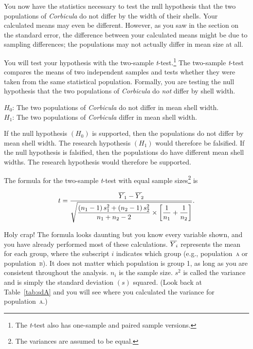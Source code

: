 \documentclass[12pt]{exam}
\newcommand*\meanY{\overline{Y\kern1.67pt}\kern-1.67pt}
\newcommand*\ttest{\emph{t}-test}
\newcommand*\popa{population~\textsc{a}} %
\newcommand*\popb{population~\textsc{b}} %
\newcommand*\Corbicula{\textit{Corbicula}}
\begin{document}
\begin{questions}
You now have the statistics necessary to test the null hypothesis that the two populations of \Corbicula{} do not differ by the width of their shells. Your calculated means may even be different. However, as you saw in the section on the standard error, the difference between your calculated means might be due to sampling differences; the populations may not actually differ in mean size at all.

You will test your hypothesis with the two-sample \ttest{}.\footnote{The \ttest{} also has one-sample and paired sample versions.} The two-sample \ttest{} compares the means of two independent samples and tests whether they were taken from the same statistical population. Formally, you are testing the null hypothesis that the two populations of \Corbicula{} do \emph{not} differ by shell width. 

\hspace*{1em} $H_0$: The two populations of \Corbicula{} do not differ in mean shell width.\\
\hspace*{1em} $H_1$: The two populations of \Corbicula{} differ in mean shell width.

If the null hypothesis $\left(H_0\right)$ is supported, then the populations do not differ by mean shell width. The research hypothesis $\left(H_1\right)$ would therefore be falsified. If the null hypothesis is falsified, then the populations do have different mean shell widths. The research hypothesis would therefore be supported.

The formula for the two-sample \ttest{} with equal sample sizes\footnote{The variances are assumed to be equal.} is


\begin{equation*}
t = \dfrac{\meanY_1 - \meanY_2}{\sqrt{\dfrac{\left(n_1 - 1\right)s_1^2 + \left(n_2 - 1\right)s_2^2}{n_1 + n_2 -2} \times \left[\dfrac{1}{n_1} + \dfrac{1}{n_2}\right]}}.
\end{equation*}

Holy crap! The formula looks daunting but you know every variable shown, and you have already performed most of these calculations. $\meanY_{i}$ represents the mean for each group, where the subscript $i$ indicates which group (e.g., \popa{} or \popb{}). It does not matter which population is group 1, as long as you are consistent throughout the analysis. $n_i$ is the sample size. $s^2$ is called the variance and is simply the standard deviation $\left(s\right)$ squared. (Look back at Table~\ref{tab:sdA} and you will see where you calculated the variance for \popa{}.) 


\end{questions}
\end{document}
